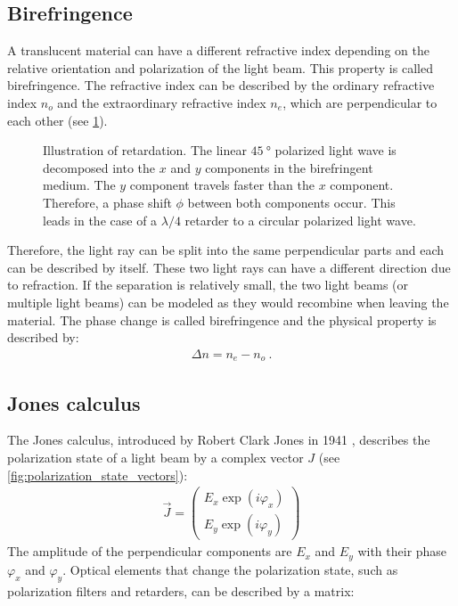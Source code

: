 \subsection{Birefringence}
%
A translucent material can have a different refractive index depending on the relative orientation and polarization of the light beam.
This property is called birefringence.
The refractive index can be described by the ordinary refractive index $n_o$ and the extraordinary refractive index $n_e$, which are perpendicular to each other (see \cref{fig:optic_retardation}).
%
\begin{figure}[!t]
\centering
\setlength{\tikzwidth}{\textwidth}
\caption[]{Illustration of retardation.
    The linear $\SI{45}{\degree}$ polarized light wave is decomposed into the $x$ and $y$ components in the birefringent medium.
    The $y$ component travels faster than the $x$ component.
    Therefore, a phase shift $\phi$ between both components occur.
    This leads in the case of a $\lambda/4$ retarder to a circular polarized light wave.}
\label{fig:optic_retardation}
\end{figure}
%
Therefore, the light ray can be split into the same perpendicular parts and each can be described by itself.
These two light rays can have a different direction due to refraction.
If the separation is relatively small, the two light beams (or multiple light beams) can be modeled as they would recombine when leaving the material.
The phase change is called birefringence and the physical property is described by:
%
\begin{align}
    \Delta n = n_e - n_o \> .
\end{align}
%
%
%
\subsection{Jones calculus}
\label{sec:jones}
%
The Jones calculus, introduced by Robert Clark Jones in 1941 \cite{Jones1941}, describes the polarization state of a light beam by a complex vector $J$ (see \cref{fig:polarization_state_vectors}):
%
\begin{align}
    \vec{J} = \begin{pmatrix} E_x \exp(i \varphi_x) \\ E_y \exp(i \varphi_y) \end{pmatrix}
\end{align}
%
The amplitude of the perpendicular components are $E_x$ and $E_y$ with their phase $\varphi_x$ and $\varphi_y$.
Optical elements that change the polarization state, such as polarization filters and retarders, can be described by a matrix:
%
